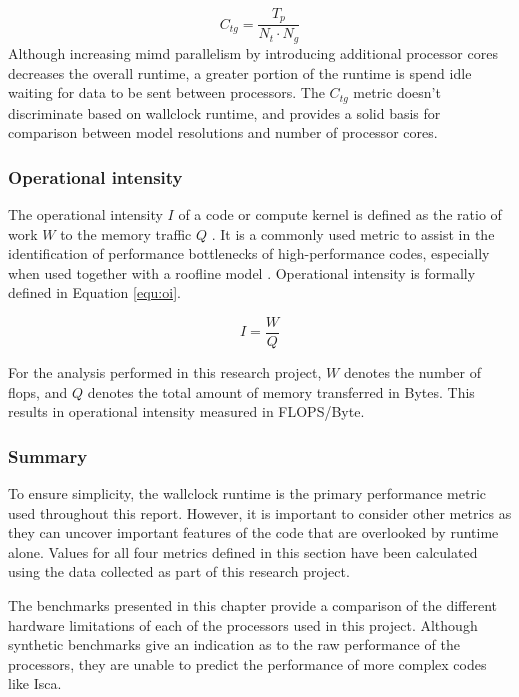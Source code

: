 \documentclass[a4paper,11pt]{report}
\begin{document}
\begin{equation}
C_{tg} = \frac{T_p}{N_t \cdot N_g}
\label{equ:cost}
\end{equation}
Although increasing \gls{mimd} parallelism by introducing additional processor cores decreases the overall runtime, a greater portion of the runtime is spend idle waiting for data to be sent between processors. The $C_{tg}$ metric doesn't discriminate based on wallclock runtime, and provides a solid basis for comparison between model resolutions and number of processor cores. 

\subsubsection{Operational intensity}
The operational intensity $I$ of a code or compute kernel is defined as the ratio of work $W$ to the memory traffic $Q$ \cite{williams2009roofline}. It is a commonly used metric to assist in the identification of performance bottlenecks of high-performance codes, especially when used together with a roofline model \cite{williams2009roofline}. Operational intensity is formally defined in Equation \ref{equ:oi}.

\begin{equation}
\label{equ:oi}
I = \frac{W}{Q}
\end{equation}
\par
For the analysis performed in this research project, $W$ denotes the number of \gls{flops}, and $Q$ denotes the total amount of memory transferred in Bytes. This results in operational intensity measured in FLOPS/Byte. 

\subsubsection{Summary}
To ensure simplicity, the wallclock runtime is the primary performance metric used throughout this report. However, it is important to consider other metrics as they can uncover important features of the code that are overlooked by runtime alone. Values for all four metrics defined in this section have been calculated using the data collected as part of this research project. 
\par
The benchmarks presented in this chapter provide a comparison of the different hardware limitations of each of the processors used in this project. Although synthetic benchmarks give an indication as to the raw performance of the processors, they are unable to predict the performance of more complex codes like Isca.
\end{document}
